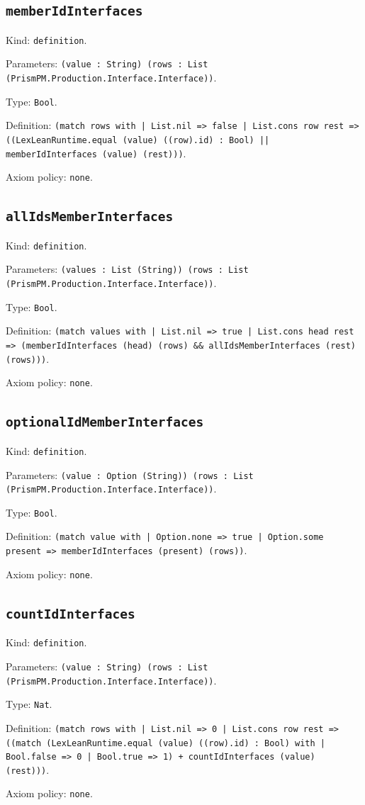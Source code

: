 \documentclass[11pt]{article}
\begin{document}
\subsection*{\texttt{memberIdInterfaces}}
\noindent Kind: \texttt{definition}.\par
\noindent Parameters: \texttt{(value : String) (rows : List (PrismPM.Production.Interface.Interface))}.\par
\noindent Type: \texttt{Bool}.\par
\noindent Definition: \texttt{(match rows with | List.nil => false | List.cons row rest => ((LexLeanRuntime.equal (value) ((row).id) : Bool) || memberIdInterfaces (value) (rest)))}.\par
\noindent Axiom policy: \texttt{none}.\par
\subsection*{\texttt{allIdsMemberInterfaces}}
\noindent Kind: \texttt{definition}.\par
\noindent Parameters: \texttt{(values : List (String)) (rows : List (PrismPM.Production.Interface.Interface))}.\par
\noindent Type: \texttt{Bool}.\par
\noindent Definition: \texttt{(match values with | List.nil => true | List.cons head rest => (memberIdInterfaces (head) (rows) \&\& allIdsMemberInterfaces (rest) (rows)))}.\par
\noindent Axiom policy: \texttt{none}.\par
\subsection*{\texttt{optionalIdMemberInterfaces}}
\noindent Kind: \texttt{definition}.\par
\noindent Parameters: \texttt{(value : Option (String)) (rows : List (PrismPM.Production.Interface.Interface))}.\par
\noindent Type: \texttt{Bool}.\par
\noindent Definition: \texttt{(match value with | Option.none => true | Option.some present => memberIdInterfaces (present) (rows))}.\par
\noindent Axiom policy: \texttt{none}.\par
\subsection*{\texttt{countIdInterfaces}}
\noindent Kind: \texttt{definition}.\par
\noindent Parameters: \texttt{(value : String) (rows : List (PrismPM.Production.Interface.Interface))}.\par
\noindent Type: \texttt{Nat}.\par
\noindent Definition: \texttt{(match rows with | List.nil => 0 | List.cons row rest => ((match (LexLeanRuntime.equal (value) ((row).id) : Bool) with | Bool.false => 0 | Bool.true => 1) + countIdInterfaces (value) (rest)))}.\par
\noindent Axiom policy: \texttt{none}.\par
\end{document}

